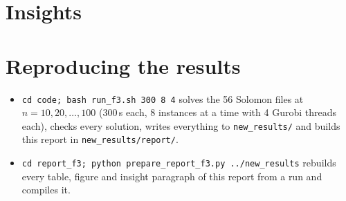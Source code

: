 \documentclass[11pt,a4paper]{article}
\begin{document}


\section{Insights}



\section{Reproducing the results}

\begin{itemize}
  \item \texttt{cd code; bash run\_f3.sh 300 8 4} solves the 56 Solomon files at $n=10,20,\dots,100$ (300\,s each, 8 instances at a time with 4 Gurobi threads each), checks every solution, writes everything to \texttt{new\_results/} and builds this report in \texttt{new\_results/report/}.
  \item \texttt{cd report\_f3; python prepare\_report\_f3.py ../new\_results} rebuilds every table, figure and insight paragraph of this report from a run and compiles it.
\end{itemize}
\end{document}
